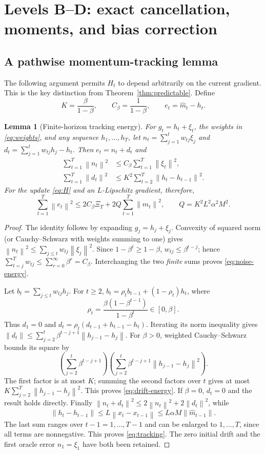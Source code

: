 \documentclass[11pt]{article}
\newtheorem{lemma}[theorem]{Lemma}
\theoremstyle{definition}
\theoremstyle{remark}
\newcommand{\norm}[1]{\left\lVert#1\right\rVert}
\begin{document}
\section{Levels B--D: exact cancellation, moments, and bias correction}
\subsection{A pathwise momentum-tracking lemma}
The following argument permits $H_t$ to depend arbitrarily on the current
gradient. This is the key distinction from Theorem~\ref{thm:predictable}.
Define
\[
 K=\frac\beta{1-\beta},\qquad C_\beta=\frac1{1-\beta},\qquad
 e_t=\widehat m_t-h_t.
\]

\begin{lemma}[Finite-horizon tracking energy]\label{lem:tracking}
For $g_t=h_t+\xi_t$, the weights in \eqref{eq:weights}, and any sequence
$h_1,\ldots,h_T$, let
$n_t=\sum_{j=1}^t w_{tj}\xi_j$ and
$d_t=\sum_{j=1}^t w_{tj}h_j-h_t$. Then $e_t=n_t+d_t$ and
\begin{align}
 \sum_{t=1}^T\norm{n_t}^2&\le C_\beta\sum_{t=1}^T\norm{\xi_t}^2,
 \label{eq:noise-energy}\\
 \sum_{t=1}^T\norm{d_t}^2&\le K^2\sum_{t=2}^T\norm{h_t-h_{t-1}}^2.
 \label{eq:drift-energy}
\end{align}
For the update \eqref{eq:H} and an $L$-Lipschitz gradient, therefore,
\begin{equation}\label{eq:tracking}
 \sum_{t=1}^T\norm{e_t}^2
 \le2C_\beta\Xi_T+2Q\sum_{t=1}^T\norm{\widehat m_t}^2,
 \qquad Q=K^2L^2\alpha^2M^2.
\end{equation}
\end{lemma}
\begin{proof}
The identity follows by expanding $g_j=h_j+\xi_j$. Convexity of squared norm
(or Cauchy--Schwarz with weights summing to one) gives
$\norm{n_t}^2\le\sum_{j\le t}w_{tj}\norm{\xi_j}^2$.
Since $1-\beta^t\ge1-\beta$, $w_{tj}\le\beta^{t-j}$; hence
$\sum_{t=j}^T w_{tj}\le\sum_{r=0}^\infty\beta^r=C_\beta$.
Interchanging the two \emph{finite} sums proves \eqref{eq:noise-energy}.

Let $b_t=\sum_{j\le t}w_{tj}h_j$. For $t\ge2$,
$b_t=\rho_t b_{t-1}+(1-\rho_t)h_t$, where
\[
 \rho_t=\frac{\beta(1-\beta^{t-1})}{1-\beta^t}\in[0,\beta].
\]
Thus $d_1=0$ and $d_t=\rho_t(d_{t-1}+h_{t-1}-h_t)$.
Iterating its norm inequality gives
$\norm{d_t}\le\sum_{j=2}^t\beta^{t-j+1}\norm{h_{j-1}-h_j}$.
For $\beta>0$, weighted Cauchy--Schwarz bounds its square by
\[
 \left(\sum_{j=2}^t\beta^{t-j+1}\right)
 \left(\sum_{j=2}^t\beta^{t-j+1}\norm{h_{j-1}-h_j}^2\right).
\]
The first factor is at most $K$; summing the second factors over $t$ gives
at most $K\sum_{j=2}^T\norm{h_{j-1}-h_j}^2$. This proves
\eqref{eq:drift-energy}. If $\beta=0$, $d_t=0$ and the result holds directly.
Finally $\norm{n_t+d_t}^2\le2\norm{n_t}^2+2\norm{d_t}^2$, while
\[
 \norm{h_t-h_{t-1}}\le L\norm{x_t-x_{t-1}}
 \le L\alpha M\norm{\widehat m_{t-1}}.
\]
The last sum ranges over $t-1=1,\ldots,T-1$ and can be enlarged to
$1,\ldots,T$, since all terms are nonnegative. This proves \eqref{eq:tracking}.
The zero initial drift and the first oracle error $n_1=\xi_1$ have both
been retained.
\end{proof}
\end{document}
